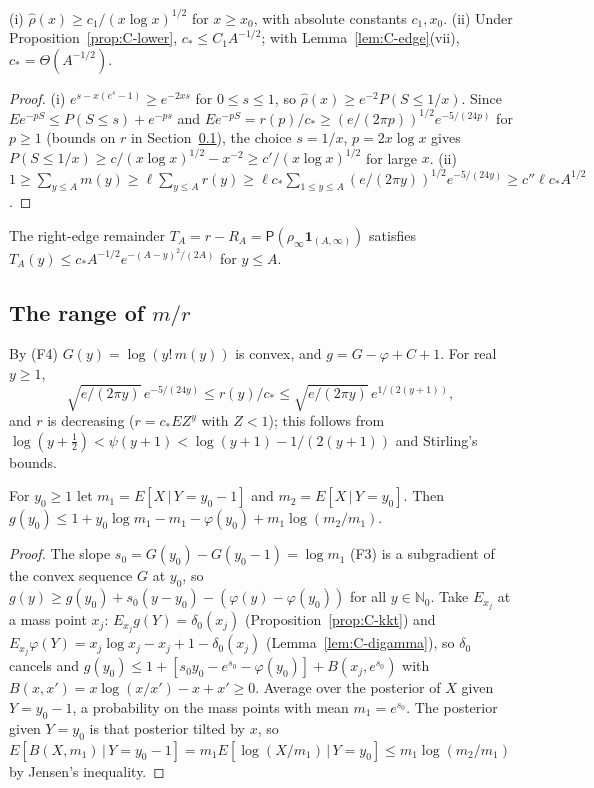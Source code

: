 \begin{lemma}\label{lem:C-sizes}
(i) $\hat\rho(x)\ge c_1/(x\log x)^{1/2}$ for $x\ge x_0$, with absolute constants $c_1,x_0$.
(ii) Under Proposition~\ref{prop:C-lower}, $c_*\le C_1A^{-1/2}$; with Lemma~\ref{lem:C-edge}(vii), $c_*=\Theta(A^{-1/2})$.
\end{lemma}
\begin{proof}
(i) $e^{s-x(e^s-1)}\ge e^{-2xs}$ for $0\le s\le1$, so $\hat\rho(x)\ge e^{-2}P(S\le1/x)$. Since $Ee^{-pS}\le P(S\le s)+e^{-ps}$ and
$Ee^{-pS}=r(p)/c_*\ge(e/(2\pi p))^{1/2}e^{-5/(24p)}$ for $p\ge1$ (bounds on $r$ in Section~\ref{sec:C-range}), the choice $s=1/x$,
$p=2x\log x$ gives $P(S\le1/x)\ge c/(x\log x)^{1/2}-x^{-2}\ge c'/(x\log x)^{1/2}$ for large $x$.
(ii) $1\ge\sum_{y\le A}m(y)\ge\ell\sum_{y\le A}r(y)\ge\ell c_*\sum_{1\le y\le A}(e/(2\pi y))^{1/2}e^{-5/(24y)}\ge c''\ell c_*A^{1/2}$.
\end{proof}

The right-edge remainder $T_A=r-R_A=\mathsf P(\rho_\infty\mathbf 1_{(A,\infty)})$ satisfies $T_A(y)\le c_*A^{-1/2}e^{-(A-y)^2/(2A)}$
for $y\le A$.

\subsection{The range of $m/r$}\label{sec:C-range}

By (F4) $G(y)=\log(y!\,m(y))$ is convex, and $g=G-\varphi+C+1$. For real $y\ge1$,
\[
\sqrt{e/(2\pi y)}\,e^{-5/(24y)}\le r(y)/c_*\le\sqrt{e/(2\pi y)}\,e^{1/(2(y+1))},
\]
and $r$ is decreasing ($r=c_*EZ^y$ with $Z<1$); this follows from $\log(y+\tfrac12)<\psi(y+1)<\log(y+1)-1/(2(y+1))$ and Stirling's
bounds.

\begin{lemma}\label{lem:C-pointwise}
For $y_0\ge1$ let $m_1=E[X\,|\,Y=y_0-1]$ and $m_2=E[X\,|\,Y=y_0]$. Then
$g(y_0)\le1+y_0\log m_1-m_1-\varphi(y_0)+m_1\log(m_2/m_1)$.
\end{lemma}
\begin{proof}
The slope $s_0=G(y_0)-G(y_0-1)=\log m_1$ (F3) is a subgradient of the convex sequence $G$ at $y_0$, so
$g(y)\ge g(y_0)+s_0(y-y_0)-(\varphi(y)-\varphi(y_0))$ for all $y\in\mathbb N_0$. Take $E_{x_j}$ at a mass point $x_j$:
$E_{x_j}g(Y)=\delta_0(x_j)$ (Proposition~\ref{prop:C-kkt}) and $E_{x_j}\varphi(Y)=x_j\log x_j-x_j+1-\delta_0(x_j)$
(Lemma~\ref{lem:C-digamma}), so $\delta_0$ cancels and $g(y_0)\le1+[s_0y_0-e^{s_0}-\varphi(y_0)]+B(x_j,e^{s_0})$ with
$B(x,x')=x\log(x/x')-x+x'\ge0$. Average over the posterior of $X$ given $Y=y_0-1$, a probability on the mass points with mean
$m_1=e^{s_0}$. The posterior given $Y=y_0$ is that posterior tilted by $x$, so $E[B(X,m_1)\,|\,Y=y_0-1]=m_1E[\log(X/m_1)\,|\,Y=y_0]
\le m_1\log(m_2/m_1)$ by Jensen's inequality.
\end{proof}

